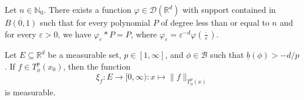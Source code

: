 \documentclass[10pt,a4paper]{amsart}
\begin{document}
\begin{lemma}\label{lemme avec fonction test conv poly est le poly}
Let $n \in \mathbb{N}_0$. There exists a function $\varphi \in \mathcal{D}(\mathbb{R}^d)$ with support contained in $\overline{B(0,1)}$ such that for every polynomial $P$ of degree less than or equal to $n$ and for every $\varepsilon > 0$, we have $\varphi_\varepsilon \ast P = P$, where $\varphi_\varepsilon = \varepsilon^{-d} \varphi\left(\frac{\cdot}{\varepsilon}\right)$.
\end{lemma}

\begin{lemma}\label{lemme 1 Rademacher}
Let $E \subseteq \mathbb{R}^d$ be a measurable set, $p \in [1,\infty]$, and $\phi \in \mathcal{B}$ such that $\underline{b}(\phi) > -d/p$. If $f \in T^p_\phi(x_0)$, then the function
\[
\xi_f : E \rightarrow [0,\infty) : x \mapsto \|f\|_{T^p_\phi(x)}
\]
is measurable.
\end{lemma}
\end{document}
